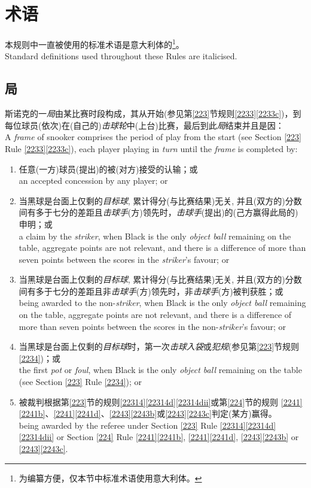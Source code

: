\section{术语}\label{222}

\noindent 本规则中一直被使用的标准术语是意大利体的\footnote{为编纂方便，仅本节中标准术语使用意大利体。}。\\
Standard definitions used throughout these Rules are italicised.

\subsection{局}\label{2221}

\noindent 斯诺克的一\emph{局}由某比赛时段构成，其从开始(参见第\ref{223}节规则\ref{2233}\ref{2233c})，到每位球员(依次)在(自己的)\emph{击球轮}中(上台)比赛，最后到此\emph{局}结束并且是因：\\
A \emph{frame} of snooker comprises the period of play from the start (see Section \ref{223} Rule \ref{2233}\ref{2233c}), each player playing in \emph{turn} until the \emph{frame} is completed by:
\begin{enumerate}[label=(\alph*)]
    \item 任意(一方)球员(提出)的被(对方)接受的认输；或\\
    an accepted concession by any player; or
    \item 当黑球是台面上仅剩的\emph{目标球}, 累计得分(与比赛结果)无关, 并且(双方的)分数间有多于七分的差距且\emph{击球手}(方)领先时，\emph{击球手}(提出)的(己方赢得此局的)申明；或\\
    a claim by the \emph{striker}, when Black is the only \emph{object ball} remaining on the table, aggregate points are not relevant, and there is a difference of more than seven points between the scores in the \emph{striker}'s favour; or
    \item 当黑球是台面上仅剩的\emph{目标球}, 累计得分(与比赛结果)无关, 并且(双方的)分数间有多于七分的差距且非\emph{击球手}(方)领先时，非\emph{击球手}(方)被判获胜；或\\
    being awarded to the non-\emph{striker}, when Black is the only \emph{object ball} remaining on the table, aggregate points are not relevant, and there is a difference of more than seven points between the scores in the non-\emph{striker}'s favour; or
    \item 当黑球是台面上仅剩的\emph{目标球}时，第一次\emph{击球入袋}或\emph{犯规}(参见第\ref{223}节规则\ref{2234})；或\\
    the first \emph{pot} or \emph{foul}, when Black is the only \emph{object ball} remaining on the table (see Section \ref{223} Rule \ref{2234}); or
    \item 被裁判根据第\ref{223}节的规则\ref{22314}\ref{22314d}\ref{22314dii}或第\ref{224}节的规则 \ref{2241}\ref{2241b}、\ref{2241}\ref{2241d}、\ref{2243}\ref{2243b}或\ref{2243}\ref{2243c}判定(某方)赢得。\\
    being awarded by the referee under Section \ref{223} Rule \ref{22314}\ref{22314d} \ref{22314dii} or Section \ref{224} Rule \ref{2241}\ref{2241b}, \ref{2241}\ref{2241d}, \ref{2243}\ref{2243b} or \ref{2243}\ref{2243c}.
\end{enumerate}

